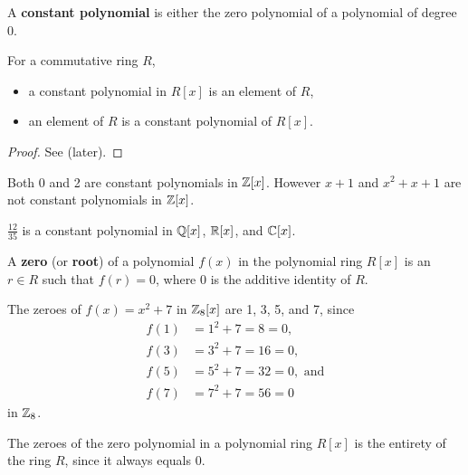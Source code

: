 \begin{definition}
    A \textbf{constant polynomial} is either the zero polynomial of a polynomial of degree 0.
\end{definition}
\begin{proposition}\label{prop-constant-polynomial-iff-ring-element}
    For a commutative ring $R$,
    \begin{itemize}
        \item a constant polynomial in $R[x]$ is an element of $R$,
        \item an element of $R$ is a constant polynomial of $R[x]$.
    \end{itemize}
\end{proposition}
\begin{proof}
    See  (later).
\end{proof}
\begin{example}
    Both 0 and 2 are constant polynomials in $\mathbb{Z}[x]$. However $x + 1$ and $x^2 + x + 1$ are not constant polynomials in $\mathbb{Z}[x]$.
\end{example}
\begin{example}
    $\frac{12}{35}$ is a constant polynomial in $\mathbb{Q}[x]$, $\mathbb{R}[x]$, and $\mathbb{C}[x]$.
\end{example}

\begin{definition}
    A \textbf{zero} (or \textbf{root}) of a polynomial $f(x)$ in the polynomial ring $R[x]$ is an $r \in R$ such that $f(r) = 0$, where 0 is the additive identity of $R$.
\end{definition}
\begin{example}
    The zeroes of $f(x) = x^2+7$ in $\mathbb{Z}_8[x]$ are 1, 3, 5, and 7, since
    \begin{align*}
        f(1) &= 1^2 + 7 = 8 = 0,\\
        f(3) &= 3^2 + 7 = 16 = 0,\\
        f(5) &= 5^2 + 7 = 32 = 0, \text{ and}\\
        f(7) &= 7^2 + 7 = 56 = 0
    \end{align*}
    in $\mathbb{Z}_8$.
\end{example}
\begin{example}
    The zeroes of the zero polynomial in a polynomial ring $R[x]$ is the entirety of the ring $R$, since it always equals 0.
\end{example}

